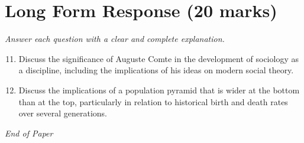\documentclass[12pt]{article}
\begin{document}
\section*{Long Form Response (20 marks)}
\textit{Answer each question with a clear and complete explanation.}
\begin{enumerate}[label=\arabic*.]
\setcounter{enumi}{10}
\item Discuss the significance of Auguste Comte in the development of sociology as a discipline, including the implications of his ideas on modern social theory.
\item Discuss the implications of a population pyramid that is wider at the bottom than at the top, particularly in relation to historical birth and death rates over several generations.
\end{enumerate}

\vfill
\noindent\textit{End of Paper}
\end{document}
